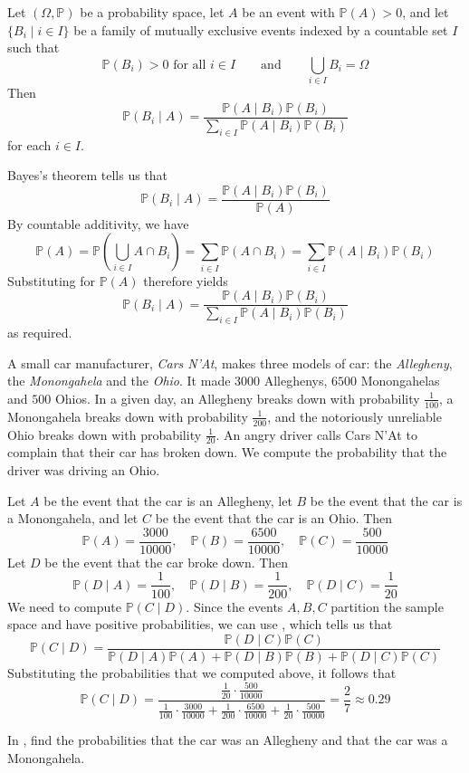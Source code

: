 \begin{corollary}
\label{corBayesGeneral}
Let $(\Omega,\mathbb{P})$ be a probability space, let $A$ be an event with $\mathbb{P}(A)>0$, and let $\{ B_i \mid i \in I \}$ be a family of mutually exclusive events indexed by a countable set $I$ such that
\[ \mathbb{P}(B_i) > 0 \text{ for all } i \in I \qquad \text{and} \qquad \bigcup_{i \in I} B_i = \Omega \]
Then
\[ \mathbb{P}(B_i \mid A) = \frac{\mathbb{P}(A \mid B_i) \mathbb{P}(B_i)}{\sum_{i \in I} \mathbb{P}(A \mid B_i)\mathbb{P}(B_i)} \]
for each $i \in I$.
\end{corollary}
\begin{cproof}
Bayes's theorem tells us that
\[ \mathbb{P}(B_i \mid A) = \frac{\mathbb{P}(A \mid B_i) \mathbb{P}(B_i)}{\mathbb{P}(A)} \]
By countable additivity, we have
\[ \mathbb{P}(A) = \mathbb{P}\left( \bigcup_{i \in I} A \cap B_i \right) = \sum_{i \in I} \mathbb{P}(A \cap B_i) = \sum_{i \in I} \mathbb{P}(A \mid B_i)\mathbb{P}(B_i) \]
Substituting for $\mathbb{P}(A)$ therefore yields
\[ \mathbb{P}(B_i \mid A) = \frac{\mathbb{P}(A \mid B_i) \mathbb{P}(B_i)}{\sum_{i \in I} \mathbb{P}(A \mid B_i)\mathbb{P}(B_i)} \]
as required.
\end{cproof}

\begin{example}
\label{exBayesCarCompany}
A small car manufacturer, \textit{Cars N'At}, makes three models of car: the \textit{Allegheny}, the \textit{Monongahela} and the \textit{Ohio}. It made $3000$ Alleghenys, $6500$ Monongahelas and $500$ Ohios. In a given day, an Allegheny breaks down with probability $\frac{1}{100}$, a Monongahela breaks down with probability $\frac{1}{200}$, and the notoriously unreliable Ohio breaks down with probability $\frac{1}{20}$. An angry driver calls Cars N'At to complain that their car has broken down. We compute the probability that the driver was driving an Ohio.

Let $A$ be the event that the car is an Allegheny, let $B$ be the event that the car is a Monongahela, and let $C$ be the event that the car is an Ohio. Then
\[ \mathbb{P}(A) = \frac{3000}{10000}, \quad \mathbb{P}(B) = \frac{6500}{10000}, \quad \mathbb{P}(C) = \frac{500}{10000} \]
Let $D$ be the event that the car broke down. Then
\[ \mathbb{P}(D \mid A) = \frac{1}{100}, \quad \mathbb{P}(D \mid B) = \frac{1}{200}, \quad \mathbb{P}(D \mid C) = \frac{1}{20} \]
We need to compute $\mathbb{P}(C \mid D)$. Since the events $A,B,C$ partition the sample space and have positive probabilities, we can use , which tells us that
\[ \mathbb{P}(C \mid D) = \frac{\mathbb{P}(D \mid C)\mathbb{P}(C)}{\mathbb{P}(D \mid A)\mathbb{P}(A)+\mathbb{P}(D \mid B)\mathbb{P}(B)+\mathbb{P}(D \mid C)\mathbb{P}(C)} \]
Substituting the probabilities that we computed above, it follows that
\[ \mathbb{P}(C \mid D) = \frac{\frac{1}{20} \cdot \frac{500}{10000}}{\frac{1}{100} \cdot \frac{3000}{10000} + \frac{1}{200} \cdot \frac{6500}{10000} + \frac{1}{20} \cdot \frac{500}{10000}} = \frac{2}{7} \approx 0.29 \]
\end{example}

\begin{exercise}
In , find the probabilities that the car was an Allegheny and that the car was a Monongahela.
\end{exercise}